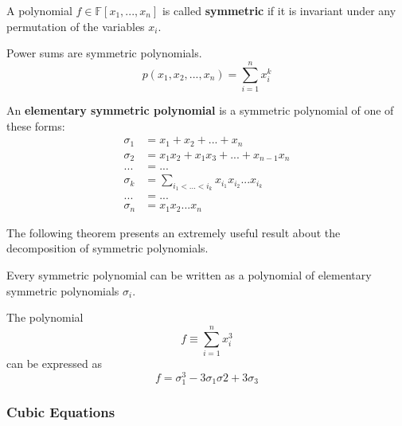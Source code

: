     \begin{definition}
      A polynomial $f \in \mathbb{F}[x_1, ..., x_n]$ is called \textbf{symmetric} if it is invariant under any permutation of the variables $x_i$. 
    \end{definition}

    \begin{example}
      Power sums are symmetric polynomials. 
      \begin{equation}
        p(x_1, x_2, ..., x_n) = \sum_{i=1}^n x_i^k
      \end{equation}
    \end{example}

    \begin{definition}
      An \textbf{elementary symmetric polynomial} is a symmetric polynomial of one of these forms: 
      \begin{align*}
        \sigma_1 & = x_1 + x_2 + ... + x_n \\
        \sigma_2 & = x_1 x_2 + x_1 x_3 + ... + x_{n-1} x_n \\
        ... & = ... \\
        \sigma_k & = \sum_{i_1 < ... < i_k} x_{i_1} x_{i_2} ... x_{i_k} \\
        ... & = ... \\
        \sigma_n & = x_1 x_2 ... x_n
      \end{align*}
    \end{definition}

    The following theorem presents an extremely useful result about the decomposition of symmetric polynomials. 

    \begin{theorem}
      Every symmetric polynomial can be written as a polynomial of elementary symmetric polynomials $\sigma_i$. 
    \end{theorem}

    \begin{example}
      The polynomial 
      \begin{equation}
        f \equiv \sum_{i=1}^n x_i^3
      \end{equation}
      can be expressed as 
      \begin{equation}
        f = \sigma_1^3 - 3 \sigma_1 \sigma 2 + 3 \sigma_3
      \end{equation}
    \end{example}

  \subsubsection{Cubic Equations}

